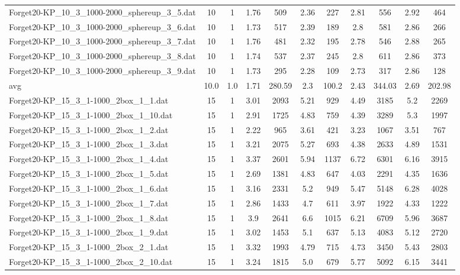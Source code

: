 \begin{table}[!ht]
\begin{tabular}{lcccccccccc}
Forget20-KP\_10\_3\_1000-2000\_sphereup\_3\_5.dat & 10 & 1 & 1.76 & 509 & 2.36 & 227 & 2.81 & 556 & 2.92 & 464 \\
Forget20-KP\_10\_3\_1000-2000\_sphereup\_3\_6.dat & 10 & 1 & 1.73 & 517 & 2.39 & 189 & 2.8 & 581 & 2.86 & 266 \\
Forget20-KP\_10\_3\_1000-2000\_sphereup\_3\_7.dat & 10 & 1 & 1.76 & 481 & 2.32 & 195 & 2.78 & 546 & 2.88 & 265 \\
Forget20-KP\_10\_3\_1000-2000\_sphereup\_3\_8.dat & 10 & 1 & 1.74 & 537 & 2.37 & 245 & 2.8 & 611 & 2.86 & 373 \\
Forget20-KP\_10\_3\_1000-2000\_sphereup\_3\_9.dat & 10 & 1 & 1.73 & 295 & 2.28 & 109 & 2.73 & 317 & 2.86 & 128 \\
\hline avg & 10.0 & 1.0 & 1.71& 280.59 & 2.3& 100.2 & 2.43& 344.03 & 2.69& 202.98\\ \hline
Forget20-KP\_15\_3\_1-1000\_2box\_1\_1.dat & 15 & 1 & 3.01 & 2093 & 5.21 & 929 & 4.49 & 3185 & 5.2 & 2269 \\
Forget20-KP\_15\_3\_1-1000\_2box\_1\_10.dat & 15 & 1 & 2.91 & 1725 & 4.83 & 759 & 4.39 & 3289 & 5.3 & 1997 \\
Forget20-KP\_15\_3\_1-1000\_2box\_1\_2.dat & 15 & 1 & 2.22 & 965 & 3.61 & 421 & 3.23 & 1067 & 3.51 & 767 \\
Forget20-KP\_15\_3\_1-1000\_2box\_1\_3.dat & 15 & 1 & 3.21 & 2075 & 5.27 & 693 & 4.38 & 2633 & 4.89 & 1531 \\
Forget20-KP\_15\_3\_1-1000\_2box\_1\_4.dat & 15 & 1 & 3.37 & 2601 & 5.94 & 1137 & 6.72 & 6301 & 6.16 & 3915 \\
Forget20-KP\_15\_3\_1-1000\_2box\_1\_5.dat & 15 & 1 & 2.69 & 1381 & 4.83 & 647 & 4.03 & 2291 & 4.35 & 1636 \\
Forget20-KP\_15\_3\_1-1000\_2box\_1\_6.dat & 15 & 1 & 3.16 & 2331 & 5.2 & 949 & 5.47 & 5148 & 6.28 & 4028 \\
Forget20-KP\_15\_3\_1-1000\_2box\_1\_7.dat & 15 & 1 & 2.86 & 1433 & 4.7 & 611 & 3.97 & 1922 & 4.33 & 1222 \\
Forget20-KP\_15\_3\_1-1000\_2box\_1\_8.dat & 15 & 1 & 3.9 & 2641 & 6.6 & 1015 & 6.21 & 6709 & 5.96 & 3687 \\
Forget20-KP\_15\_3\_1-1000\_2box\_1\_9.dat & 15 & 1 & 3.02 & 1453 & 5.1 & 637 & 5.13 & 4083 & 5.12 & 2720 \\
Forget20-KP\_15\_3\_1-1000\_2box\_2\_1.dat & 15 & 1 & 3.32 & 1993 & 4.79 & 715 & 4.73 & 3450 & 5.43 & 2803 \\
Forget20-KP\_15\_3\_1-1000\_2box\_2\_10.dat & 15 & 1 & 3.24 & 1815 & 5.0 & 679 & 5.77 & 5092 & 6.15 & 3441 \\

\end{tabular}
\end{table}
